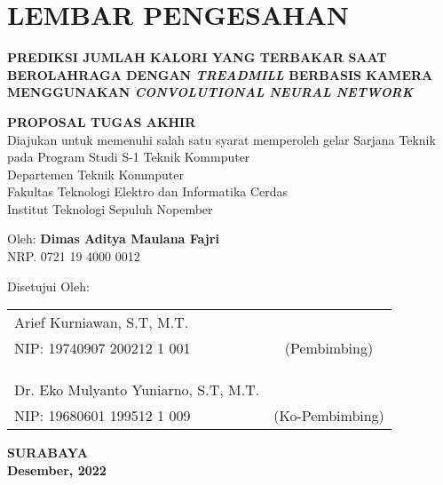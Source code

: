 \chapter*{LEMBAR PENGESAHAN}

\thispagestyle{empty}

\begin{center}
  \textbf{PREDIKSI JUMLAH KALORI YANG TERBAKAR SAAT BEROLAHRAGA DENGAN \emph{TREADMILL} BERBASIS KAMERA MENGGUNAKAN \emph{CONVOLUTIONAL NEURAL NETWORK}}
\end{center}

\begingroup
\small

\begin{center}
  \textbf{PROPOSAL TUGAS AKHIR} \\
    Diajukan untuk memenuhi salah satu syarat memperoleh gelar
    Sarjana Teknik pada 
    Program Studi S-1 Teknik Kommputer \\
    Departemen Teknik Kommputer \\
    Fakultas Teknologi Elektro dan Informatika Cerdas \\
    Institut Teknologi Sepuluh Nopember
\end{center}

\begin{center}
  Oleh: \textbf{Dimas Aditya Maulana Fajri} \\
  NRP. 0721 19 4000 0012
\end{center}

\begin{center}
  Disetujui Oleh:
\end{center}

\vspace{10ex}

\begingroup
\setlength{\tabcolsep}{0pt}

\noindent
\begin{tabularx}{\textwidth}{X c}
  Arief Kurniawan, S.T, M.T.      &                 \\
  NIP: 19740907 200212 1 001    & (Pembimbing)    \\
                                &                 \\
                                &                 \\
                                &                 \\
  Dr. Eko Mulyanto Yuniarno, S.T, M.T. &                 \\
  NIP: 19680601 199512 1 009    & (Ko-Pembimbing) \\
\end{tabularx}
\endgroup

\vspace{\fill}

\begin{center}
  \textbf{SURABAYA} \\
  \textbf{Desember, 2022}
\end{center}
\endgroup
